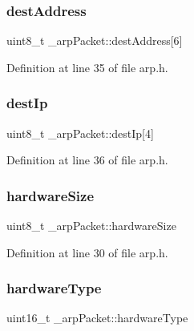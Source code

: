\subsubsection{\texorpdfstring{dest\+Address}{destAddress}}
{\footnotesize\ttfamily uint8\+\_\+t \+\_\+arp\+Packet\+::dest\+Address\mbox{[}6\mbox{]}}



Definition at line 35 of file arp.\+h.

\mbox{\label{struct__arpPacket_aff29f4d16913664389e708a89eb40510}} 
\subsubsection{\texorpdfstring{dest\+Ip}{destIp}}
{\footnotesize\ttfamily uint8\+\_\+t \+\_\+arp\+Packet\+::dest\+Ip\mbox{[}4\mbox{]}}



Definition at line 36 of file arp.\+h.

\mbox{\label{struct__arpPacket_a722bf3490b264b96540b94863c6a027d}} 
\subsubsection{\texorpdfstring{hardware\+Size}{hardwareSize}}
{\footnotesize\ttfamily uint8\+\_\+t \+\_\+arp\+Packet\+::hardware\+Size}



Definition at line 30 of file arp.\+h.

\mbox{\label{struct__arpPacket_a839c94f50cb7173a20785682e441d948}} 
\subsubsection{\texorpdfstring{hardware\+Type}{hardwareType}}
{\footnotesize\ttfamily uint16\+\_\+t \+\_\+arp\+Packet\+::hardware\+Type}



